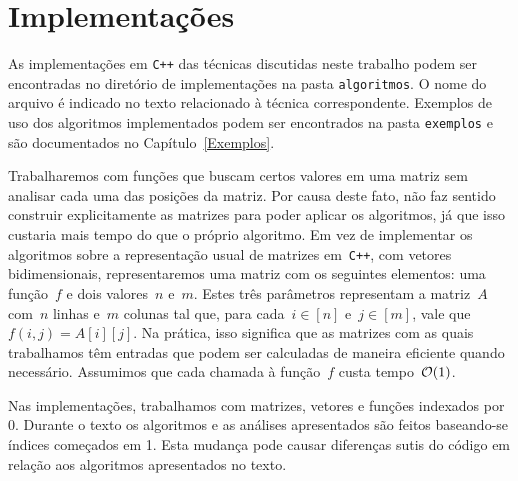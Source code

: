 \section{Implementações} \label{Intro:impl}
As implementações em \texttt{C++} das técnicas discutidas neste trabalho podem ser encontradas no diretório de implementações na pasta \texttt{algoritmos}. O nome do arquivo é indicado no texto relacionado à técnica correspondente. Exemplos de uso dos algoritmos implementados podem ser encontrados na pasta \texttt{exemplos} e são documentados no Capítulo~\ref{Exemplos}.

Trabalharemos com funções que buscam certos valores em uma matriz sem analisar cada uma das posições da matriz. Por causa deste fato, não faz sentido construir explicitamente as matrizes para poder aplicar os algoritmos, já que isso custaria mais tempo do que o próprio algoritmo. Em vez de implementar os algoritmos sobre a representação usual de matrizes em~\texttt{C++}, com vetores bidimensionais, representaremos uma matriz com os seguintes elementos: uma função~$f$ e dois valores~$n$ e~$m$. Estes três parâmetros representam a matriz~$A$ com~$n$ linhas e~$m$ colunas tal que, para cada~${ i \in [n] }$ e~${ j \in [m] }$, vale que~${ f(i,j) = A[i][j] }$. Na prática, isso significa que as matrizes com as quais trabalhamos têm entradas que podem ser calculadas de maneira eficiente quando necessário. Assumimos que cada chamada à função~$f$ custa tempo~$\mathcal{O}(1)$.

Nas implementações, trabalhamos com matrizes, vetores e funções indexados por 0. Durante o texto os algoritmos e as análises apresentados são feitos baseando-se índices começados em 1. Esta mudança pode causar diferenças sutis do código em relação aos algoritmos apresentados no texto.

